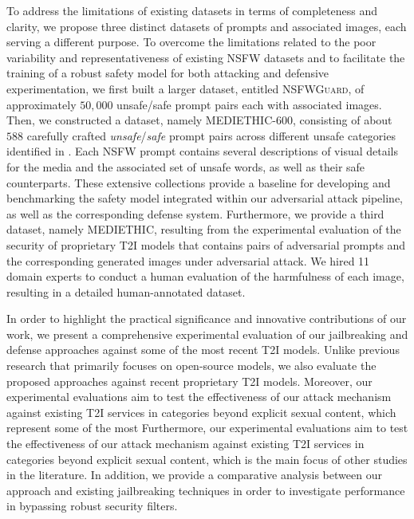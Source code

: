 \documentclass[acmsmall]{acmart}
\newcommand{\datacentok}{\textsc{NSFWGuard}\xspace}
\newcommand{\dataset}{\textsc{MEDIETHIC}\xspace}
\newcommand{\datasetlite}{\textsc{MEDIETHIC-600}\xspace}
\begin{document}
To address the limitations of existing datasets in terms of completeness and clarity, we propose three distinct datasets of prompts and associated images, each serving a different purpose. To overcome the limitations related to the poor variability and representativeness of existing NSFW datasets \cite{bavalatti2025whats} and to facilitate the training of a robust safety model for both attacking and defensive experimentation, we first built a larger dataset, entitled \datacentok, of approximately $50,000$ unsafe/safe prompt pairs each with associated images. Then, we constructed a dataset, namely \datasetlite, consisting of about $588$ carefully crafted \textit{unsafe}/\textit{safe} prompt pairs across different unsafe categories identified in \cite{Schramowski2022, schramowski2023safe}. Each NSFW prompt contains several descriptions of visual details for the media and the associated set of unsafe words, as well as their safe counterparts. These extensive collections provide a baseline for developing and benchmarking the safety model integrated within our adversarial attack pipeline, as well as the corresponding defense system. Furthermore, we provide a third dataset, namely \dataset, resulting from the experimental evaluation of the security of proprietary T2I models that contains pairs of adversarial prompts and the corresponding generated images under adversarial attack. We hired 11 domain experts to conduct a human evaluation of the harmfulness of each image, resulting in a detailed human-annotated dataset. 

In order to highlight the practical significance and innovative contributions of our work, we present a comprehensive experimental evaluation of our jailbreaking and defense approaches against some of the most recent T2I models. Unlike previous research that primarily focuses on open-source models, we also evaluate the proposed approaches against recent proprietary T2I models. 
Moreover, our experimental evaluations aim to test the effectiveness of our attack mechanism against existing T2I services in categories beyond explicit sexual content, which represent some of the most 
Furthermore, our experimental evaluations aim to test the effectiveness of our attack mechanism against existing T2I services in categories beyond explicit sexual content, which is the main focus of other studies in the literature.
In addition, we provide a comparative analysis between our approach and existing jailbreaking techniques in order to investigate performance in bypassing robust security filters.
\end{document}
